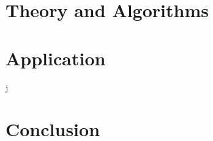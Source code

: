 \documentclass[10pt,oneside]{book}
\begin{document}
    \mainmatter
    \pagestyle{fancy}
    

    

    \part{Theory and Algorithms} \label{part:theory}
    
    

    
    

    
    
    

    \part{Application} \label{part:application}
    j
    

    \part{Conclusion}
    

    \appendix
    

    \printbibliography
    
\end{document}
